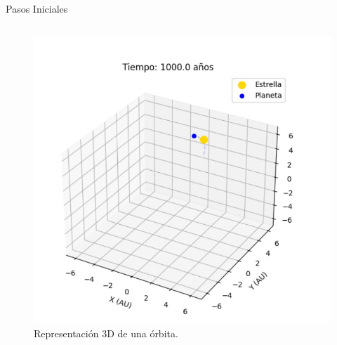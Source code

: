 \begin{frame}{Pasos Iniciales}
\begin{columns}[T]
        \begin{column}{0.38\textwidth} 
            \begin{figure}
                \centering
                \includegraphics[width=\textwidth]{img/conclusion/simulacion.jpeg} 
                \caption{Representación 3D de una órbita.}
            \end{figure}
        \end{column}
    \end{columns}
\end{frame}


